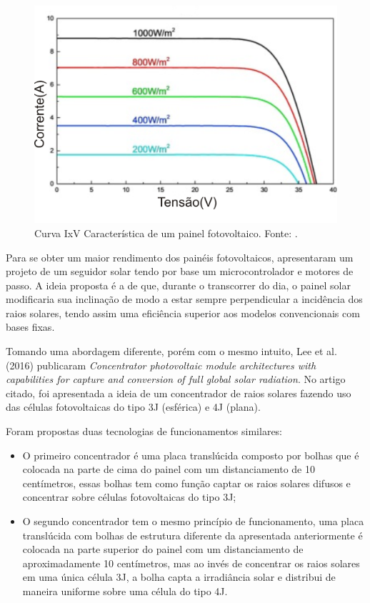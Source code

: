 \FloatBarrier
\begin{figure}[htbp]
	\centering
	\includegraphics[scale=1.3]{imagens/IV_Gao}
	\caption{Curva IxV Característica de um painel fotovoltaico. Fonte:  \cite{GAO201852}.  }
	
	\label{fig:IVGao}
\end{figure}
\FloatBarrier

Para se obter um maior rendimento dos painéis fotovoltaicos,  apresentaram um projeto de um seguidor solar tendo por base um microcontrolador e motores de passo. A ideia proposta é a de que, durante o transcorrer do dia, o painel solar modificaria sua inclinação de modo a estar sempre perpendicular a incidência dos raios solares, tendo assim uma eficiência superior aos modelos convencionais com bases fixas.

Tomando uma abordagem diferente, porém com o mesmo intuito, Lee et al. (2016) publicaram \textit{Concentrator photovoltaic module architectures with capabilities for capture and conversion of full global solar radiation}. No artigo citado, foi apresentada a ideia de um concentrador de raios solares fazendo uso das células fotovoltaicas do tipo 3J (esférica) e 4J (plana). 

Foram propostas duas tecnologias de funcionamentos similares:

\begin{itemize}
	\item O primeiro concentrador é uma placa translúcida composto por bolhas que é colocada na parte de cima do painel com um distanciamento de 10 centímetros, essas bolhas tem como função captar os raios solares difusos e concentrar sobre células fotovoltaicas do tipo 3J;
	\item O segundo concentrador tem o mesmo princípio de funcionamento, uma placa translúcida com bolhas de estrutura diferente da apresentada anteriormente é colocada na parte superior do painel com um distanciamento de aproximadamente 10 centímetros, mas ao invés de concentrar os raios solares em uma única célula 3J, a bolha capta a irradiância solar e distribui de maneira uniforme sobre uma célula do tipo 4J.
\end{itemize}

